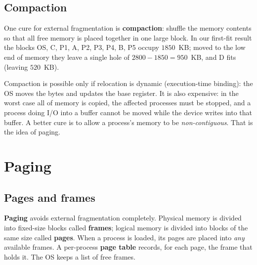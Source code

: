 \documentclass[11pt,a4paper]{article}
\newcommand{\term}[1]{\textbf{\color{mintdeep}#1}}
\begin{document}
\subsection{Compaction}

One cure for external fragmentation is \term{compaction}: shuffle the memory contents so that all free memory is placed together in one large block. In our first-fit result the blocks OS, C, P1, A, P2, P3, P4, B, P5 occupy $1850$~KB; moved to the low end of memory they leave a single hole of $2800 - 1850 = 950$~KB, and D fits (leaving $520$~KB).

Compaction is possible only if relocation is dynamic (execution-time binding): the OS moves the bytes and updates the base register. It is also expensive: in the worst case all of memory is copied, the affected processes must be stopped, and a process doing I/O into a buffer cannot be moved while the device writes into that buffer. A better cure is to allow a process's memory to be \emph{non-contiguous}. That is the idea of paging.

\section{Paging}
\label{sec:paging}

\subsection{Pages and frames}

\term{Paging} avoids external fragmentation completely. Physical memory is divided into fixed-size blocks called \term{frames}; logical memory is divided into blocks of the same size called \term{pages}. When a process is loaded, its pages are placed into \emph{any} available frames. A per-process \term{page table} records, for each page, the frame that holds it. The OS keeps a list of free frames.
\end{document}
